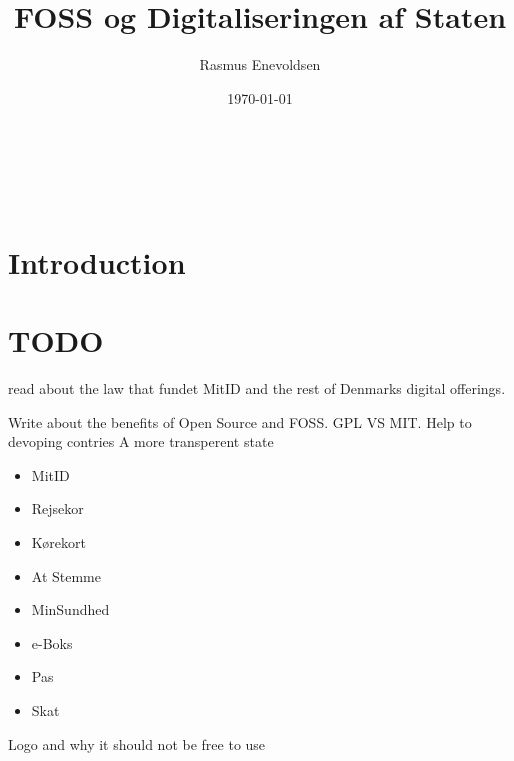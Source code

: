 \documentclass[twoside,12pt,a4paper]{article}
\title{FOSS og Digitaliseringen af Staten}
\author{Rasmus Enevoldsen}
\date{\today}
\begin{document}
	\begin{titlepage}
		\begin{center}
			\Huge \thetitle\\
			\LARGE \theauthor
			\vfill
			\vfill
			\normalsize %
      \thedate\\
      \pageref{LastPage}
		\end{center}
		\setcounter{page}{0}
	\end{titlepage}

    \section{Introduction}

    \section{TODO}
    read about the law that fundet MitID and the rest of Denmarks digital offerings. 
    
    Write about the benefits of Open Source and FOSS. 
    GPL VS MIT. 
        Help to devoping contries
        A more transperent state

    \begin{itemize}
        \item MitID
        \item Rejsekor
        \item Kørekort
        \item At Stemme
        \item MinSundhed
        \item e-Boks
        \item Pas
        \item Skat
    \end{itemize}




    Logo and why it should not be free to use
    
    \newpage
    \printbibliography
\end{document}
